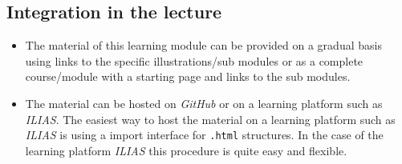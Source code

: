 \documentclass[12pt]{article}
\begin{document}



\subsection{Integration in the lecture}

\begin{itemize}
	\item The material of this learning module can be provided on a gradual basis using links to the specific illustrations/sub modules or as a complete course/module with a starting page and links to the sub modules.
	\item The material can be hosted on \emph{GitHub} or on a learning platform such as \emph{ILIAS}. The easiest way to host the material on a learning platform such as \emph{ILIAS} is using a import interface for \texttt{.html} structures. In the case of the learning platform \emph{ILIAS} this procedure is quite easy and flexible.	
\end{itemize}
\end{document}
